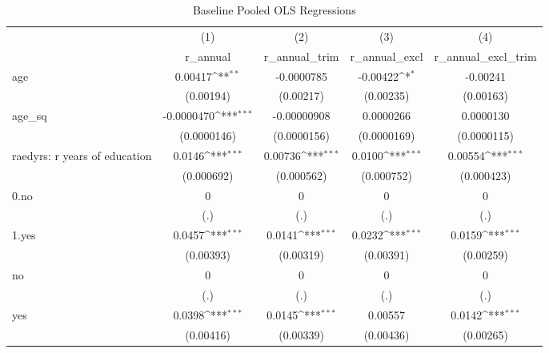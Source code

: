 \begin{table}[htbp]\centering
\def\sym#1{\ifmmode^{#1}\else\(^{#1}\)\fi}
\caption{Baseline Pooled OLS Regressions}
\begin{tabular}{l*{4}{c}}
\toprule
                &\multicolumn{1}{c}{(1)}&\multicolumn{1}{c}{(2)}&\multicolumn{1}{c}{(3)}&\multicolumn{1}{c}{(4)}\\
                &\multicolumn{1}{c}{r\_annual}&\multicolumn{1}{c}{r\_annual\_trim}&\multicolumn{1}{c}{r\_annual\_excl}&\multicolumn{1}{c}{r\_annual\_excl\_trim}\\
\midrule
age             &  0.00417\sym{**} &-0.0000785         & -0.00422\sym{*}  & -0.00241         \\
                &(0.00194)         &(0.00217)         &(0.00235)         &(0.00163)         \\
\addlinespace
age\_sq          &-0.0000470\sym{***}&-0.00000908         &0.0000266         &0.0000130         \\
                &(0.0000146)         &(0.0000156)         &(0.0000169)         &(0.0000115)         \\
\addlinespace
raedyrs: r years of education&   0.0146\sym{***}&  0.00736\sym{***}&   0.0100\sym{***}&  0.00554\sym{***}\\
                &(0.000692)         &(0.000562)         &(0.000752)         &(0.000423)         \\
\addlinespace
0.no            &        0         &        0         &        0         &        0         \\
                &      (.)         &      (.)         &      (.)         &      (.)         \\
\addlinespace
1.yes           &   0.0457\sym{***}&   0.0141\sym{***}&   0.0232\sym{***}&   0.0159\sym{***}\\
                &(0.00393)         &(0.00319)         &(0.00391)         &(0.00259)         \\
\addlinespace
no              &        0         &        0         &        0         &        0         \\
                &      (.)         &      (.)         &      (.)         &      (.)         \\
\addlinespace
yes             &   0.0398\sym{***}&   0.0145\sym{***}&  0.00557         &   0.0142\sym{***}\\
                &(0.00416)         &(0.00339)         &(0.00436)         &(0.00265)         \\

\end{tabular}
\end{table}
